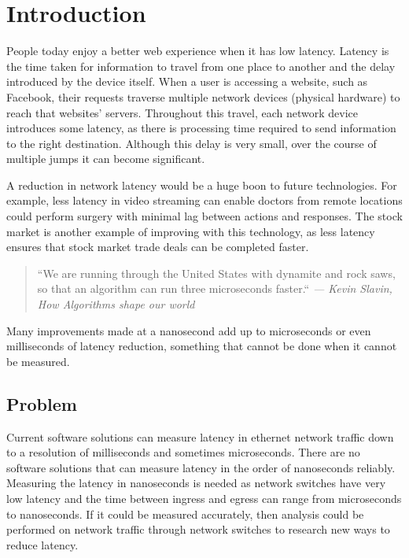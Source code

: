 \chapter{Introduction}\label{C:intro}

\par People today enjoy a better web experience when it has low latency. Latency is the time taken for
information to travel from one place to another and the delay introduced by the device itself. When
a user is accessing a website, such as Facebook, their requests traverse multiple network devices
(physical hardware) to reach that websites’ servers. Throughout this travel, each network device
introduces some latency, as there is processing time required to send information to the right
destination. Although this delay is very small, over the course of multiple jumps it can become
significant.

\par A reduction in network latency would be a huge boon to future technologies. For example, less
latency in video streaming can enable doctors from remote locations could perform surgery with
minimal lag between actions and responses. The stock market is another example of improving with
this technology, as less latency ensures that stock market trade deals can be completed faster.

\begin{quote}
    \centering
    ``We are running through the United States with dynamite and rock saws, so that an algorithm can
    run three microseconds faster.`` \em --- Kevin Slavin, How Algorithms shape our world \cite{tedTalkAlgorithms}
\end{quote} 

Many improvements made at a nanosecond add up to microseconds or even milliseconds of latency
reduction, something that cannot be done when it cannot be measured.

\section{Problem}

\par Current software solutions can measure latency in ethernet network traffic down to a resolution of
milliseconds and sometimes microseconds. There are no software solutions that can measure
latency in the order of nanoseconds reliably. Measuring the latency in nanoseconds is needed as
network switches have very low latency and the time between ingress and egress can range from
microseconds to nanoseconds. If it could be measured accurately, then analysis could be performed
on network traffic through network switches to research new ways to reduce latency.

